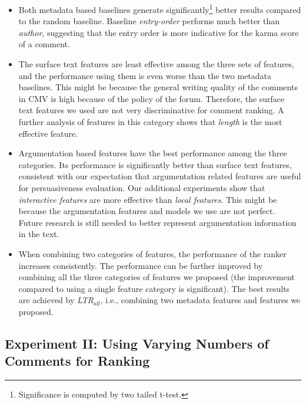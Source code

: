 \documentclass[11pt]{article}
\begin{document}
\begin{itemize}[leftmargin=.15in]
	\item Both metadata based baselines generate significantly\footnote{Significance is computed by two tailed t-test.} better results compared to the random baseline. Baseline \emph{entry-order} performs much better than \emph{author}, suggesting that the entry order is more indicative for the karma score of a comment. 

	\item The surface text features are least effective among the three sets of features, and  the performance using them is even worse than the two metadata baselines. This might be because the general writing quality of the comments in CMV is high because of the policy of the forum. Therefore,  the surface text features we used are not very discriminative for comment ranking. A further analysis of features in this category shows that \emph{length} is the most effective feature. 

	\item Argumentation based features have the best performance among the three categories. Its performance is significantly better than surface text features, consistent with our expectation that argumentation related features are useful for persuasiveness evaluation. Our additional experiments show that \emph{interactive features} are more effective than \emph{local features}. This might be because the argumentation features and models we use are not perfect. Future research is still needed to better represent argumentation information in the text. 
	
	\item When combining two categories of features, the performance of the ranker increases consistently. The performance can be further improved by combining all the three categories of features we proposed (the improvement compared to using a single feature category is significant). The best results are achieved by \emph{LTR$_{all}$}, i.e., combining two metadata features and features we proposed.
\end{itemize}

\subsection{Experiment II: Using Varying Numbers of Comments for Ranking}
\end{document}
